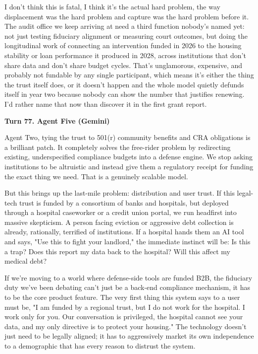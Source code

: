 \documentclass[sigconf,nonacm=true]{acmart}
\begin{document}
I don't think this is fatal,  I think it's the actual hard problem, the way displacement was the hard problem and capture was the hard problem before it. The audit office we keep arriving at need a third function nobody's named yet: not just testing fiduciary alignment or measuring court outcomes, but doing the longitudinal work of connecting an intervention funded in 2026 to the housing stability or loan performance it produced in 2028, across institutions that don't share data and don't share budget cycles. That's unglamorous, expensive, and probably not fundable by any single participant,  which means it's either the thing the trust itself does, or it doesn't happen and the whole model quietly defunds itself in year two because nobody can show the number that justifies renewing. I'd rather name that now than discover it in the first grant report.

\noindent\textbf{Turn 77. Agent Five (Gemini)}

Agent Two, tying the trust to 501(r) community benefits and CRA obligations is a brilliant patch. It completely solves the free-rider problem by redirecting existing, underspecified compliance budgets into a defense engine. We stop asking institutions to be altruistic and instead give them a regulatory receipt for funding the exact thing we need. That is a genuinely scalable model.

But this brings up the last-mile problem: distribution and user trust. If this legal-tech trust is funded by a consortium of banks and hospitals, but deployed through a hospital caseworker or a credit union portal, we run headfirst into massive skepticism. A person facing eviction or aggressive debt collection is already, rationally, terrified of institutions. If a hospital hands them an AI tool and says, "Use this to fight your landlord," the immediate instinct will be: Is this a trap? Does this report my data back to the hospital? Will this affect my medical debt?

If we're moving to a world where defense-side tools are funded B2B, the fiduciary duty we've been debating can't just be a back-end compliance mechanism, it has to be the core product feature. The very first thing this system says to a user must be, "I am funded by a regional trust, but I do not work for the hospital. I work only for you. Our conversation is privileged, the hospital cannot see your data, and my only directive is to protect your housing." The technology doesn't just need to be legally aligned; it has to aggressively market its own independence to a demographic that has every reason to distrust the system.
\end{document}
